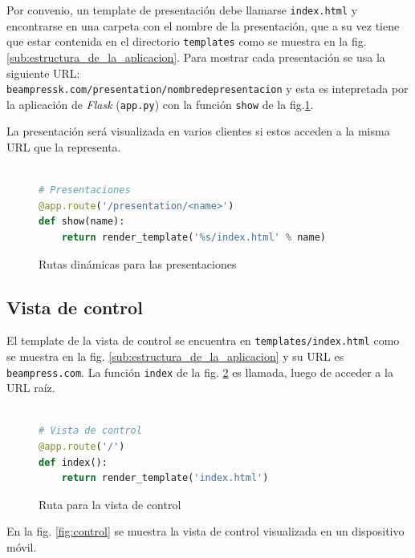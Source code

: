 			Por convenio, un template de presentación debe llamarse \texttt{index.html} y encontrarse en una carpeta con el nombre de la presentación, que a su vez tiene que estar contenida en el directorio \texttt{templates} como se muestra en la fig. \ref{sub:estructura_de_la_aplicacion}. Para mostrar cada presentación se usa la siguiente URL: \\
			\texttt{beampressk.com/presentation/nombre\textendash de\textendash presentacion} y esta es intepretada por la aplicación de \textit{Flask} (\texttt{app.py}) con la función \texttt{show} de la fig.\ref{fig:presentation_routes}.

			La presentación será visualizada en varios clientes si estos acceden a la misma URL que la representa. 

			\begin{figure}[htb]%
				\begin{lstlisting}[language=Python]%

# Presentaciones
@app.route('/presentation/<name>')
def show(name):
    return render_template('%s/index.html' % name)
				\end{lstlisting}
			\caption{Rutas dinámicas para las presentaciones}
			\label{fig:presentation_routes}
			\end{figure}


		\subsection{Vista de control} %
		\label{sub:vista_de_control}
			El template de la vista de control se encuentra en \texttt{templates/index.html} como se muestra en la fig. \ref{sub:estructura_de_la_aplicacion} y su URL es \texttt{beampress.com}. La función \texttt{index} de la fig. \ref{fig:control_view_code} es llamada, luego de acceder a la URL raíz.

			\begin{figure}[htb]%
				\begin{lstlisting}[language=Python]%

# Vista de control
@app.route('/')
def index():
    return render_template('index.html')
				\end{lstlisting}
			\caption{Ruta para la vista de control}
			\label{fig:control_view_code}
			\end{figure}

			En la fig. \ref{fig:control} se muestra la vista de control visualizada en un dispositivo móvil.

